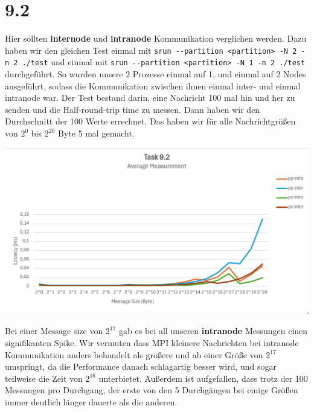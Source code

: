 \documentclass{report}
\begin{document}
\section*{9.2}
Hier sollten \textbf{internode} und \textbf{intranode} Kommunikation verglichen 
werden. Dazu haben wir den
gleichen Test einmal mit \newline
\verb|srun --partition <partition> -N 2 -n 2 ./test| \newline
und einmal mit \newline
\verb|srun --partition <partition> -N 1 -n 2 ./test| \newline
durchgeführt. So wurden unsere 2 Prozesse einmal auf 1, und einmal auf 2 Nodes 
ausgeführt, sodass die Kommunikation zwischen ihnen einmal inter- und
einmal intranode war. Der Test bestand darin, eine Nachricht 100 mal hin und 
her zu senden und die Half-round-trip time zu
messen. Dann haben wir den Durchschnitt der 100 Werte errechnet. Das haben wir 
für alle Nachrichtgrößen von \( 2^{0} \) bis \( 2^{20} \) Byte 5 mal gemacht.
\begin{center}
	\includegraphics[width=\textwidth]{Intra-Inter}
\end{center}
Bei einer Message size von \( 2^{17} \) gab es bei all unseren 
\textbf{intranode} Messungen einen signifikanten Spike. Wir vermuten dass MPI 
kleinere Nachrichten
bei intranode Kommunikation anders behandelt als größere und ab einer Größe von 
\( 2^{17} \) umspringt, da die Performance danach schlagartig besser wird, und
sogar teilweise die Zeit von \( 2^{16} \) unterbietet. \newline
Außerdem ist aufgefallen, dass trotz der 100 Messungen pro Durchgang, der erste 
von den 5 Durchgängen bei einige Größen immer deutlich länger
dauerte als die anderen.
\newpage
\end{document}

